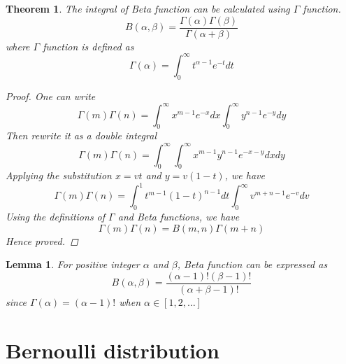 \documentclass[a4paper]{article}
\newtheorem{theorem}{Theorem}[section]
\newtheorem{lemma}{Lemma}[section]
\begin{document}
\begin{theorem}
    The integral of Beta function can be calculated using $\Gamma$ function.
    \begin{equation}
        B(\alpha, \beta) = \frac{\Gamma(\alpha)\Gamma(\beta)}{\Gamma(\alpha+\beta)}
    \end{equation}
    where $\Gamma$ function is defined as
    \begin{equation}
        \Gamma(\alpha) = \int_{0}^{\infty} t^{\alpha-1} e^{-t} dt
        \label{eq: Gamma function}
    \end{equation}

    \begin{proof}
        One can write
        \begin{equation*}
            \Gamma(m)\Gamma(n) = \int_{0}^{\infty} x^{m-1} e^{-x} dx \int_{0}^{\infty} y^{n-1} e^{-y} dy
        \end{equation*}
        Then rewrite it as a double integral
        \begin{equation*}
            \Gamma(m)\Gamma(n) = \int_{0}^{\infty} \int_{0}^{\infty} x^{m-1} y^{n-1} e^{-x-y} dx dy
        \end{equation*}
        Applying the substitution $x=vt$ and $y=v(1-t)$, we have
        \begin{equation*}
            \Gamma(m)\Gamma(n) = \int_{0}^{1} t^{m-1} (1-t)^{n-1} dt \int_{0}^{\infty} v^{m+n-1} e^{-v} dv
        \end{equation*}
        Using the definitions of $\Gamma$ and Beta functions, we have
        \begin{equation*}
            \Gamma(m)\Gamma(n) = B(m, n) \Gamma(m+n)
        \end{equation*}
        Hence proved.
    \end{proof}
\end{theorem}

\begin{lemma}
    For positive integer $\alpha$ and $\beta$, Beta function can be expressed as
    \begin{equation}
        B(\alpha, \beta) = \frac{(\alpha-1)!(\beta-1)!}{(\alpha+\beta-1)!}
    \end{equation}
    since $\Gamma(\alpha) = (\alpha-1)!$ when $\alpha \in [1, 2, \ldots]$
\end{lemma}

\section{Bernoulli distribution}
\end{document}
